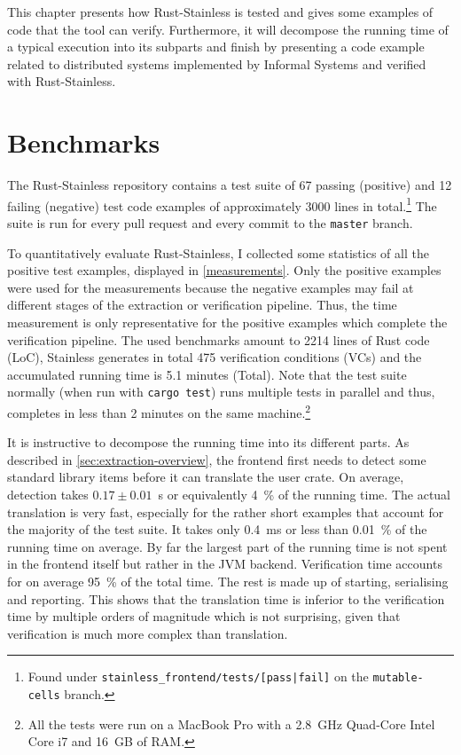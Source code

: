 This chapter presents how Rust-Stainless is tested and gives some examples of
code that the tool can verify. Furthermore, it will decompose the running time
of a typical execution into its subparts and finish by presenting a code example
related to distributed systems implemented by Informal Systems and verified with
Rust-Stainless.

\section{Benchmarks}

The Rust-Stainless repository contains a test suite of 67 passing (positive) and
12 failing (negative) test code examples of approximately 3000
lines in total.\footnote{Found under \texttt{stainless\_frontend/tests/[pass|fail]} on
the \texttt{mutable-cells} branch.} The suite is run for every pull request and
every commit to the \texttt{master} branch.

To quantitatively evaluate Rust-Stainless, I collected some statistics of all
the positive test examples, displayed in \autoref{measurements}. Only the
positive examples were used for the measurements because the negative examples
may fail at different stages of the extraction or verification pipeline. Thus,
the time measurement is only representative for the positive examples which
complete the verification pipeline. The used benchmarks amount to 2214 lines of
Rust code (LoC), Stainless generates in total 475 verification conditions (VCs)
and the accumulated running time is 5.1 minutes (Total). Note that the test
suite normally (when run with \texttt{cargo test}) runs multiple tests in
parallel and thus, completes in less than 2 minutes on the same
machine.\footnote{All the tests were run on a MacBook Pro with a 2.8~GHz
Quad-Core Intel Core i7 and 16~GB of RAM.}

It is instructive to decompose the running time into its different parts. As
described in \autoref{sec:extraction-overview}, the frontend first needs to
detect some standard library items before it can translate the user crate. On
average, detection takes $0.17 \pm 0.01$~s or equivalently 4~\% of the running
time. The actual translation is very fast, especially for the rather short
examples that account for the majority of the test suite. It takes only 0.4~ms
or less than 0.01~\% of the running time on average. By far the largest part of
the running time is not spent in the frontend itself but rather in the JVM
backend. Verification time accounts for on average 95~\% of the total time. The
rest is made up of starting, serialising and reporting. This shows that the
translation time is inferior to the verification time by multiple orders of
magnitude which is not surprising, given that verification is much more complex
than translation.

